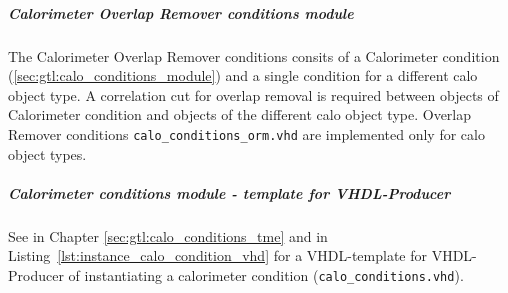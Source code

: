\clearpage

\subparagraph{Calorimeter Overlap Remover conditions module}\label{sec:gtl:calo_conditions_orm_module}
The Calorimeter Overlap Remover conditions consits of a Calorimeter condition (\ref{sec:gtl:calo_conditions_module}) and a single condition for a different calo object type. A correlation cut for overlap removal is required between objects of Calorimeter condition and objects of the different calo object type.
Overlap Remover conditions \texttt{calo\_conditions\_orm.vhd} are implemented only for calo object types.

\subparagraph{Calorimeter conditions module - template for VHDL-Producer}
See in Chapter \ref{sec:gtl:calo_conditions_tme} and in Listing~\ref{lst:instance_calo_condition_vhd} for a VHDL-template for VHDL-Producer of
instantiating a calorimeter condition (\texttt{calo\_conditions.vhd}).\\


